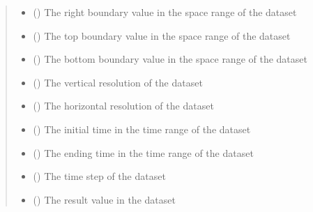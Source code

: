 \documentclass[letterpaper,10pt,english]{sphinxmanual}
\begin{document}
\begin{fulllineitems}
\begin{fulllineitems}
\begin{quote}
\begin{description}
\begin{itemize}
\item {} 
 () \textendash{} The right boundary value in the space range of the dataset

\item {} 
 () \textendash{} The top boundary value in the space range of the dataset

\item {} 
 () \textendash{} The bottom boundary value in the space range of the dataset

\item {} 
 () \textendash{} The vertical resolution of the dataset

\item {} 
 () \textendash{} The horizontal resolution of the dataset

\item {} 
 () \textendash{} The initial time in the time range of the dataset

\item {} 
 () \textendash{} The ending time in the time range of the dataset

\item {} 
 () \textendash{} The time step of the dataset

\item {} 
 () \textendash{} The result value in the dataset


\end{itemize}
\end{description}
\end{quote}
\end{fulllineitems}
\end{fulllineitems}
\end{document}
